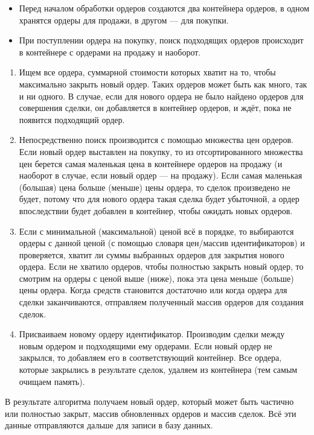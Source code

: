 \begin{itemize}
    \item Перед началом обработки ордеров создаются два контейнера ордеров, в одном хранятся ордеры для продажи, в другом — для покупки.
    \item При поступлении ордера на покупку, поиск подходящих ордеров происходит в контейнере с ордерами на продажу и наоборот.
\end{itemize}

\begin{enumerate}
    \item Ищем все ордера, суммарной стоимости которых хватит на то, чтобы максимально закрыть новый ордер.
Таких ордеров может быть как много, так и ни одного.
В случае, если для нового ордера не было найдено ордеров для совершения сделки, он добавляется в контейнер ордеров, и ждёт, пока не появится подходящий ордер.

    \item Непосредственно поиск производится с помощью множества цен ордеров.
Если новый ордер выставлен на покупку, то из отсортированного множества цен берется самая маленькая цена в контейнере ордеров на продажу (и наоборот в случае, если новый ордер — на продажу).
Если самая маленькая (большая) цена больше (меньше) цены ордера, то сделок произведено не будет, потому что для нового ордера такая сделка будет убыточной, а ордер впоследствии будет добавлен в контейнер, чтобы ожидать новых ордеров.

    \item Если с минимальной (максимальной) ценой всё в порядке, то выбираются ордеры с данной ценой (с помощью словаря цен/массив идентификаторов) и проверяется, хватит ли суммы выбранных ордеров для закрытия нового ордера.
Если не хватило ордеров, чтобы полностью закрыть новый ордер, то смотрим на ордеры с ценой выше (ниже), пока эта цена меньше (больше) цены ордера.
Когда средств становится достаточно или когда ордера для сделки заканчиваются, отправляем полученный массив ордеров для создания сделок.

    \item Присваиваем новому ордеру идентификатор.
Производим сделки между новым ордером и подходящими ему ордерами.
Если новый ордер не закрылся, то добавляем его в соответствующий контейнер.
Все ордера, которые закрылись в результате сделок, удаляем из контейнера (тем самым очищаем память).
\end{enumerate}

В результате алгоритма получаем новый ордер, который может быть частично или полностью закрыт, массив обновленных ордеров и массив сделок. Всё эти данные отправляются дальше для записи в базу данных.

